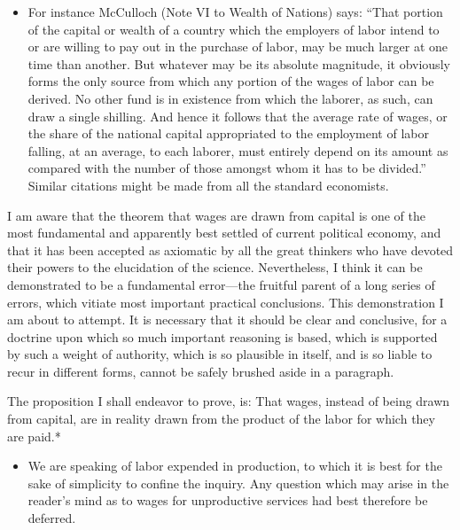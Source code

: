 \begin{itemize}
\tightlist
\item
  For instance McCulloch (Note VI to Wealth of Nations) says: ``That
  portion of the capital or wealth of a country which the employers of
  labor intend to or are willing to pay out in the purchase of labor,
  may be much larger at one time than another. But whatever may be its
  absolute magnitude, it obviously forms the only source from which any
  portion of the wages of labor can be derived. No other fund is in
  existence from which the laborer, as such, can draw a single shilling.
  And hence it follows that the average rate of wages, or the share of
  the national capital appropriated to the employment of labor falling,
  at an average, to each laborer, must entirely depend on its amount as
  compared with the number of those amongst whom it has to be divided.''
  Similar citations might be made from all the standard economists.
\end{itemize}

I am aware that the theorem that wages are drawn from capital is one of
the most fundamental and apparently best settled of current political
economy, and that it has been accepted as axiomatic by all the great
thinkers who have devoted their powers to the elucidation of the
science. Nevertheless, I think it can be demonstrated to be a
fundamental error---the fruitful parent of a long series of errors,
which vitiate most important practical conclusions. This demonstration I
am about to attempt. It is necessary that it should be clear and
conclusive, for a doctrine upon which so much important reasoning is
based, which is supported by such a weight of authority, which is so
plausible in itself, and is so liable to recur in different forms,
cannot be safely brushed aside in a paragraph.

The proposition I shall endeavor to prove, is: That wages, instead of
being drawn from capital, are in reality drawn from the product of the
labor for which they are paid.*

\begin{itemize}
\tightlist
\item
  We are speaking of labor expended in production, to which it is best
  for the sake of simplicity to confine the inquiry. Any question which
  may arise in the reader's mind as to wages for unproductive services
  had best therefore be deferred.
\end{itemize}

